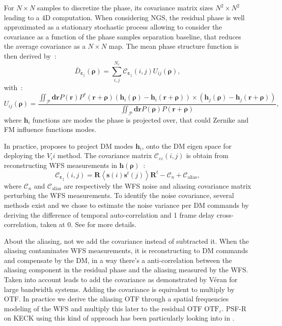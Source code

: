 \documentclass[12pt]{article}
\newcommand{\para}[1]{\left(#1\right)}
\newcommand{\aver}[1]{\left\langle #1 \right\rangle}
\newcommand{\R}{\boldsymbol{\text{R}}}
\newcommand{\rbb}{\boldsymbol{r}}
\newcommand{\rhob}{\boldsymbol{\rho}}
\newcommand{\otf}[1]{\text{OTF}_{#1}}
\newcommand{\epspara}{\boldsymbol{\varepsilon}_\parallel}
\newcommand{\hi}{\boldsymbol{h}_i}
\newcommand{\hj}{\boldsymbol{h}_j}
\begin{document}
For $N\times N$ samples to discretize the phase, its covariance matrix sizes $N^2\times N^2$ leading to a 4D computation. When considering NGS, the residual phase is well approximated as a stationary stochastic process allowing to consider the covariance as a function of the phase samples separation baseline, that reduces the average covariance as a $N\times N$ map. The mean phase structure function is then derived by~:
\begin{equation} \label{E:Dphiavg}
\bar{D}_{\epspara}(\rhob) = \sum \limits_{i,j}^{N_c} \mathcal{C}_{\epspara}(i,j) U_{ij}(\rhob),
\end{equation}
with~:
\begin{equation} \label{E:Uij}
U_{ij}(\rhob) = \dfrac{\iint_\mathcal{P} \boldsymbol{dr}  P(\rbb)P^\ast(\rbb + \rhob)\para{\hi(\rhob) - \hi(\rbb + \rhob)} \times 
	\para{\hj(\rhob) - \hj(\rbb + \rhob)}} {\iint_\mathcal{P}\boldsymbol{dr} P(\rhob)P(\rbb + \rhob)},
\end{equation}
where $\hi$ functions are modes the phase is projected over, that could Zernike and FM influence functions modes. 

In practice, \cite{Gendron2006} proposes to project DM modes $\hi$, onto the DM eigen space for deploying the $V_ii$ method. The covariance matrix $\mathcal{C}_{\varepsilon\varepsilon}(i,j)$ is obtain from reconstructing WFS measurements in $\boldsymbol{h}(\rhob)$~:
\begin{equation}
	\mathcal{C}_{\epspara}(i,j) =  \R\aver{\boldsymbol{s}(i) \boldsymbol{s}^t(j)}\R^t - \mathcal{C}_{n} + \mathcal{C}_\text{alias},
\end{equation}
where $\mathcal{C}_{n}$ and $\mathcal{C}_\text{alias}$ are respectively  the WFS noise and aliasing covariance matrix perturbing the WFS measurements. To identify the noise covariance, several methods exist and we chose to estimate the noise variance per DM commands by deriving the difference of temporal auto-correlation and 1 frame delay cross-correlation, taken at 0. See \cite{Flicker2008} for more details.

About the aliasing, not we add the covariance instead of subtracted it. When the aliasing contaminates WFS measurements, it is reconstructing to DM commands and compensate by the DM, in a way there's a anti-correlation between the aliasing component in the residual phase and the aliasing measured by the WFS. Taken into account leads to add the covariance as demonstrated by V\'eran for large bandwidth systems. Adding the covariance is equivalent to multiply by OTF. In practice we derive the aliasing OTF through a spatial frequencies modeling of the WFS and multiply this later to the residual OTF $\otf{\varepsilon}$. PSF-R on KECK using this kind of approach has been particularly looking into in \cite{Jolissaint2015}.
\end{document}
